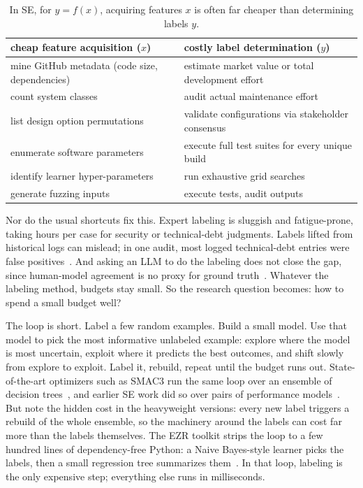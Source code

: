 \documentclass[10pt,conference]{IEEEtran}
\begin{document}
\begin{table}[t]
\caption{In SE, for $y=f(x)$, acquiring features $x$ is often far
cheaper than determining labels $y$.}
\label{tab:xy}
\centering
{\footnotesize
\begin{tabular}{p{}|p{}}
\hline
{\bf cheap feature acquisition ($x$)} & {\bf costly label determination ($y$)} \\
\hline
mine GitHub metadata (code size, dependencies) &
estimate market value or total development effort \\
count system classes &
audit actual maintenance effort \\
list design option permutations &
validate configurations via stakeholder consensus \\
enumerate software parameters &
execute full test suites for every unique build \\
identify learner hyper-parameters &
run exhaustive grid searches \\
generate fuzzing inputs &
execute tests, audit outputs \\
\hline
\end{tabular}}
\end{table}

Nor do the usual shortcuts fix this. Expert labeling is sluggish and
fatigue-prone, taking hours per case for security or technical-debt
judgments. Labels lifted from historical logs can mislead; in one
audit, most logged technical-debt entries were false
positives~\cite{yu22}. And asking an LLM to do the labeling does not
close the gap, since human-model agreement is no proxy for ground
truth~\cite{ahmed25}. Whatever the labeling method, budgets stay
small. So the research question becomes: how to spend a small budget
well?

The loop is short. Label a few random examples. Build a small model.
Use that model to pick the most informative unlabeled example: explore
where the model is most uncertain, exploit where it predicts the best
outcomes, and shift slowly from explore to exploit. Label it, rebuild,
repeat until the budget runs out. State-of-the-art optimizers such as
SMAC3 run the same loop over an ensemble of decision
trees~\cite{lindauer22}, and earlier SE work did so over pairs of
performance models~\cite{nair18}. But note the hidden cost in the
heavyweight versions: every new label triggers a rebuild of the whole
ensemble, so the machinery around the labels can cost far more than
the labels themselves. The EZR toolkit strips the loop to
a few hundred lines of dependency-free Python: a Naive Bayes-style
learner picks the labels, then a small regression tree summarizes
them~\cite{menzies26}. In that loop, labeling is the only expensive
step; everything else runs in milliseconds.
\end{document}
